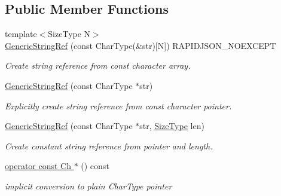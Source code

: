 \subsection*{Public Member Functions}
\begin{DoxyCompactItemize}
\item 
{\footnotesize template$<$Size\+Type N$>$ }\\\hyperlink{struct_generic_string_ref_aae0c070f914d2486a560150a927c22dc}{Generic\+String\+Ref} (const Char\+Type(\&str)\mbox{[}N\mbox{]}) R\+A\+P\+I\+D\+J\+S\+O\+N\+\_\+\+N\+O\+E\+X\+C\+E\+PT
\begin{DoxyCompactList}\small\item\em Create string reference from {\ttfamily const} character array. \end{DoxyCompactList}\item 
\hyperlink{struct_generic_string_ref_a9e80d81d5ad49cf0fb4128ace8c548d9}{Generic\+String\+Ref} (const Char\+Type $\ast$str)
\begin{DoxyCompactList}\small\item\em Explicitly create string reference from {\ttfamily const} character pointer. \end{DoxyCompactList}\item 
\hyperlink{struct_generic_string_ref_a8b2c6a7fdc4da1e7055f7fdcf0ac517f}{Generic\+String\+Ref} (const Char\+Type $\ast$str, \hyperlink{rapidjson_8h_a5ed6e6e67250fadbd041127e6386dcb5}{Size\+Type} len)
\begin{DoxyCompactList}\small\item\em Create constant string reference from pointer and length. \end{DoxyCompactList}\item 
\hyperlink{struct_generic_string_ref_a61a4241c23f65626ddc1da4ae5dac1b8}{operator const Ch $\ast$} () const \hypertarget{struct_generic_string_ref_a61a4241c23f65626ddc1da4ae5dac1b8}{}\label{struct_generic_string_ref_a61a4241c23f65626ddc1da4ae5dac1b8}

\begin{DoxyCompactList}\small\item\em implicit conversion to plain Char\+Type pointer \end{DoxyCompactList}\end{DoxyCompactItemize}
